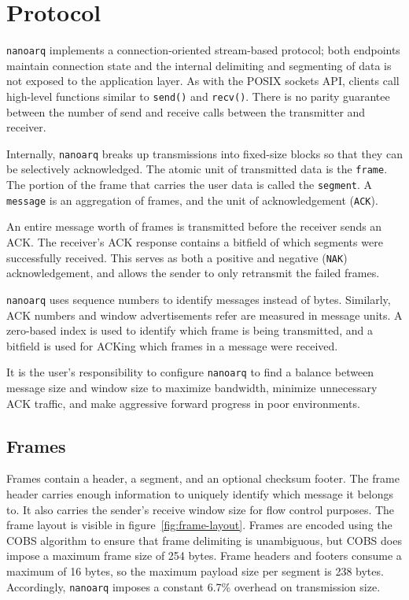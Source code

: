 \documentclass[11pt]{article}
\newcommand{\nanoarq}{\texttt{nanoarq}}
\begin{document}
\section{Protocol}
\nanoarq{} implements a connection-oriented stream-based protocol; both endpoints maintain connection state and the internal delimiting and segmenting of data is not exposed to the application layer. As with the POSIX sockets API, clients call high-level functions similar to \texttt{send()} and \texttt{recv()}. There is no parity guarantee between the number of send and receive calls between the transmitter and receiver. \par

Internally, \nanoarq{} breaks up transmissions into fixed-size blocks so that they can be selectively acknowledged. The atomic unit of transmitted data is the \texttt{frame}. The portion of the frame that carries the user data is called the \texttt{segment}. A \texttt{message} is an aggregation of frames, and the unit of acknowledgement (\texttt{ACK}). \par

An entire message worth of frames is transmitted before the receiver sends an ACK. The receiver's ACK response contains a bitfield of which segments were successfully received. This serves as both a positive and negative (\texttt{NAK}) acknowledgement, and allows the sender to only retransmit the failed frames. \par

\nanoarq{} uses sequence numbers to identify messages instead of bytes. Similarly, ACK numbers and window advertisements refer are measured in message units. A zero-based index is used to identify which frame is being transmitted, and a bitfield is used for ACKing which frames in a message were received. \par

It is the user's responsibility to configure \nanoarq{} to find a balance between message size and window size to maximize bandwidth, minimize unnecessary ACK traffic, and make aggressive forward progress in poor environments. \par

\subsection{Frames}
Frames contain a header, a segment, and an optional checksum footer. The frame header carries enough information to uniquely identify which message it belongs to. It also carries the sender's receive window size for flow control purposes. The frame layout is visible in figure~\ref{fig:frame-layout}. Frames are encoded using the COBS algorithm to ensure that frame delimiting is unambiguous, but COBS does impose a maximum frame size of 254 bytes. Frame headers and footers consume a maximum of 16 bytes, so the maximum payload size per segment is 238 bytes. Accordingly, \nanoarq{} imposes a constant 6.7\% overhead on transmission size.\par
\end{document}
